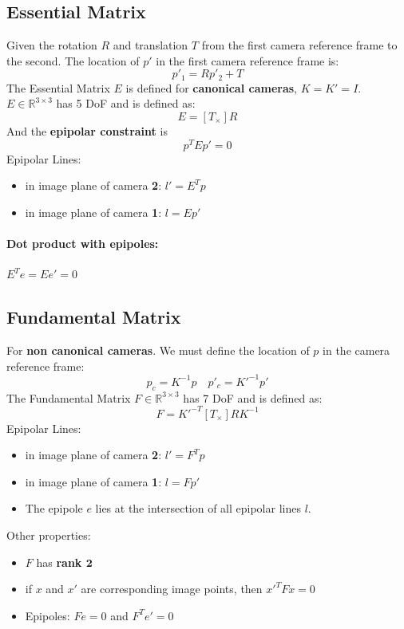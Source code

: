 \documentclass[8pt, a4paper, landscape, includeheadfoot]{extarticle}
\begin{document}
\begin{multicols*}{4}
	\subsection{Essential Matrix}
	Given the rotation $R$ and translation $T$ from the first camera reference frame to the second. The location of $p'$ in the first camera reference frame is:
	$$
		p'_{1} = Rp'_{2} + T
	$$
	The Essential Matrix $E$ is defined for \textbf{canonical cameras}, $K = K' = I$. $E\in\mathbb{R}^{3\times 3}$ has 5 DoF and is defined as:
	$$
		E = \left[T_\times\right] R
	$$
	And the \textbf{epipolar constraint} is
	$$
		p^T E p' = 0
	$$
	Epipolar Lines:
	\begin{itemize}[itemsep=0pt, leftmargin=8pt]
		\item in image plane of camera \textbf{2}: $l' = E^T p$
		\item in image plane of camera \textbf{1}: $l = E p'$
	\end{itemize}
	\paragraph{Dot product with epipoles:} $E^T e = Ee' = 0$

	\subsection{Fundamental Matrix}

	For \textbf{non canonical cameras}. We must define the location of $p$ in the camera reference frame:
	$$
		p_c  = K^{-1}p \quad p'_c = K'^{-1}p'
	$$
	The Fundamental Matrix $F\in\mathbb{R}^{3\times 3}$ has 7 DoF and is defined as:
	$$
		F = K'^{-T}\left[T_\times\right] R K^{-1}
	$$
	Epipolar Lines:
	\begin{itemize}[itemsep=0pt, leftmargin=8pt]
		\item in image plane of camera \textbf{2}: $l' = F^T p$
		\item in image plane of camera \textbf{1}: $l = F p'$
		\item The epipole $e$ lies at the intersection of all epipolar lines $l$.
	\end{itemize}
	Other properties:
	\begin{itemize}[itemsep=0pt, leftmargin=8pt]
		\item $F$ has \textbf{rank $\mathbf 2$}
		\item if $x$ and $x'$ are corresponding image points, then $x'^T F x = 0$
		\item Epipoles: $Fe = 0$ and $F^T e' = 0$
	\end{itemize}


\end{multicols*}
\end{document}
